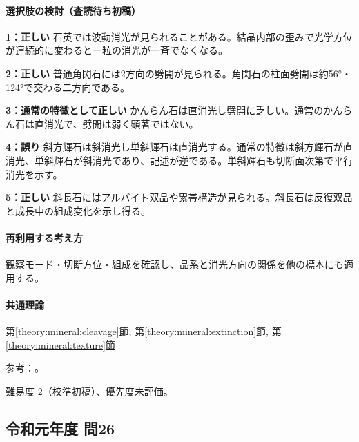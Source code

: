 \paragraph{選択肢の検討（査読待ち初稿）}\mbox{}\par

\noindent\textbf{1：正しい} 石英では波動消光が見られることがある。結晶内部の歪みで光学方位が連続的に変わると一粒の消光が一斉でなくなる。\par

\noindent\textbf{2：正しい} 普通角閃石には2方向の劈開が見られる。角閃石の柱面劈開は約56°・124°で交わる二方向である。\par

\noindent\textbf{3：通常の特徴として正しい} かんらん石は直消光し劈開に乏しい。通常のかんらん石は直消光で、劈開は弱く顕著ではない。\par

\noindent\textbf{4：誤り} 斜方輝石は斜消光し単斜輝石は直消光する。通常の特徴は斜方輝石が直消光、単斜輝石が斜消光であり、記述が逆である。単斜輝石も切断面次第で平行消光を示す。\par

\noindent\textbf{5：正しい} 斜長石にはアルバイト双晶や累帯構造が見られる。斜長石は反復双晶と成長中の組成変化を示し得る。\par

\paragraph{再利用する考え方} 観察モード・切断方位・組成を確認し、晶系と消光方向の関係を他の標本にも適用する。

\paragraph{共通理論} \hyperref[theory:mineral:cleavage]{第\ref*{theory:mineral:cleavage}節}, \hyperref[theory:mineral:extinction]{第\ref*{theory:mineral:extinction}節}, \hyperref[theory:mineral:texture]{第\ref*{theory:mineral:texture}節}

\par 参考：\cite{nelson_inosilicates,nelson_biaxial,hom_albite}。

\par 難易度 2（校準初稿）、優先度未評価。

\subsection{令和元年度 問26}
\label{q:r01-reg-applied-26}

